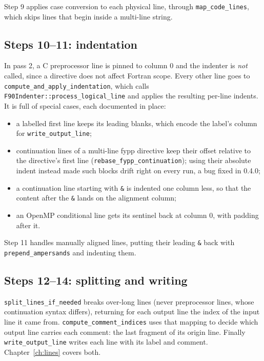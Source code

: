\documentclass[11pt,a4paper,openany]{book}
\newcommand{\code}[1]{\texttt{\small #1}}
\begin{document}
Step 9 applies case conversion to each physical line, through
\code{map\_code\_lines}, which skips lines that begin inside a multi-line
string.

\subsection{Steps 10--11: indentation}

In pass 2, a C preprocessor line is pinned to column 0 and the indenter is
\emph{not} called, since a directive does not affect Fortran scope. Every other line
goes to \code{compute\_and\_apply\_indentation}, which calls
\code{F90Indenter::process\_logical\_line} and applies the resulting
per-line indents. It is full of special cases, each documented in place:

\begin{itemize}
  \item a labelled first line keeps its leading blanks, which encode the
    label's column for \code{write\_output\_line};
  \item continuation lines of a multi-line fypp directive keep their offset
    relative to the directive's first line (\code{rebase\_fypp\_continuation});
    using their absolute indent instead made such blocks drift right on every
    run, a bug fixed in 0.4.0;
  \item a continuation line starting with \code{\&} is indented one column less, so
    that the content after the \code{\&} lands on the alignment column;
  \item an OpenMP conditional line gets its sentinel back at column 0, with
    padding after it.
\end{itemize}

Step 11 handles manually aligned lines, putting their leading \code{\&} back with
\code{prepend\_ampersands} and indenting them.

\subsection{Steps 12--14: splitting and writing}

\code{split\_lines\_if\_needed} breaks over-long lines (never preprocessor
lines, whose continuation syntax differs), returning for each output line the
index of the input line it came from. \code{compute\_comment\_indices} uses that
mapping to decide which output line carries each comment: the last fragment of
its origin line. Finally \code{write\_output\_line} writes each line with its
label and comment. Chapter~\ref{ch:lines} covers both.
\end{document}
